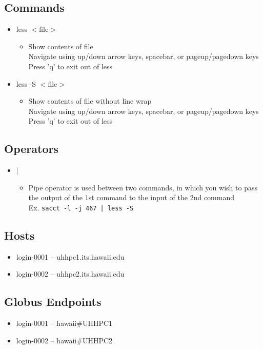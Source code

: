 \documentclass[11pt,twocolumn]{article}
\newcommand{\lft}{$<$}
\newcommand{\rht}{$>$}
\newcommand{\pth}[1]{{\lft}#1{\rht}}
\newcommand{\desc}[1]{\small \begin{itemize}\item[]#1\end{itemize}}
\begin{document}
\subsection{Commands}
\begin{itemize}
\item[] less \pth{file} \desc{Show contents of file\\Navigate using up/down arrow keys, spacebar, or pageup/pagedown keys\\  Press 'q' to exit out of less}
\item[] less -S \pth{file} \desc{Show contents of file without line wrap\\Navigate using up/down arrow keys, spacebar, or pageup/pagedown keys\\Press 'q' to exit out of less}

\end{itemize}


\subsection{Operators}
\begin{itemize}
\item[] | \desc{Pipe operator is used between two commands, in which you wish to pass the output of the 1st command to the input of the 2nd command\\Ex. \texttt{sacct -l -j 467 | less -S }}
\end{itemize}

\subsection{Hosts}
\begin{itemize}
\item[] login-0001 -- uhhpc1.its.hawaii.edu
\item[] login-0002 -- uhhpc2.its.hawaii.edu
\end{itemize}

\subsection{Globus Endpoints}
\begin{itemize}
\item[] login-0001 -- hawaii#UHHPC1
\item[] login-0002 -- hawaii#UHHPC2
\end{itemize}
\end{document}
